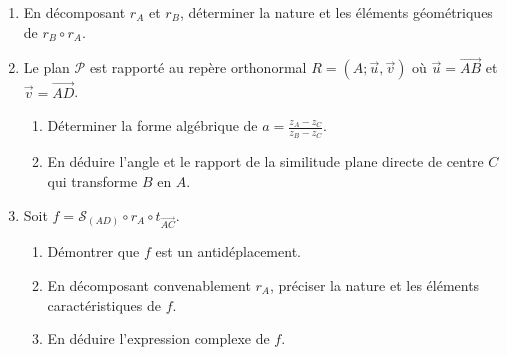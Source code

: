             \begin{enumerate}
                  \item En d\'ecomposant $r_A$ et $r_B$, d\'eterminer la nature et les \'el\'ements g\'eom\'etriques de $r_B \circ r_A$.
                  \item Le plan $\mathscr{P}$ est rapport\'e au rep\`ere orthonormal $R = (A ; \vec{u} , \vec{v})$ o\`u $\vec{u} = \overrightarrow{AB}$ et $\vec{v} = \overrightarrow{AD}$.
                        \begin{enumerate}
                              \item D\'eterminer la forme alg\'ebrique de $a=\frac{z_A - z_C}{z_B - z_C}$.
                              \item En d\'eduire l'angle et le rapport de la similitude plane directe de centre $C$ qui transforme $B$ en $A$.
                        \end{enumerate}
                  \item Soit $f = \mathscr{S}_{(AD)} \circ r_A \circ t_{\overrightarrow{AC}}$.
                        \begin{enumerate}
                              \item D\'emontrer que $f$ est un antid\'eplacement.
                              \item En d\'ecomposant convenablement $r_A$, pr\'eciser la nature et les \'el\'ements caract\'eristiques de $f$.
                              \item En d\'eduire l'expression complexe de $f$.
                        \end{enumerate}
            \end{enumerate}
      

